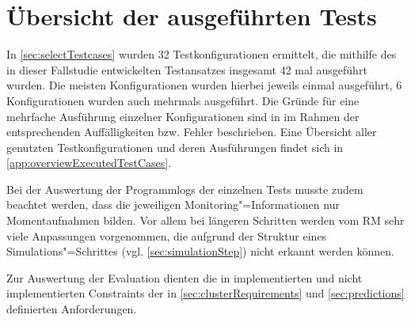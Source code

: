 \section{Übersicht der ausgeführten Tests}
\label{sec:overviewExecTestCases}

In \autoref{sec:selectTestcases} wurden 32 Testkonfigurationen ermittelt, die mithilfe des in dieser Fallstudie entwickelten Testansatzes insgesamt 42 mal ausgeführt wurden.
Die meisten Konfigurationen wurden hierbei jeweils einmal ausgeführt, 6 Konfigurationen wurden auch mehrmals ausgeführt.
Die Gründe für eine mehrfache Ausführung einzelner Konfigurationen sind in im Rahmen der entsprechenden Auffälligkeiten bzw. Fehler beschrieben.
Eine Übersicht aller genutzten Testkonfigurationen und deren Ausführungen findet sich in \autoref{app:overviewExecutedTestCases}.

Bei der Auswertung der Programmlogs der einzelnen Tests musste zudem beachtet werden, dass die jeweiligen Monitoring"=Informationen nur Momentaufnahmen bilden.
Vor allem bei längeren Schritten werden vom \ac{RM} sehr viele Anpassungen vorgenommen, die aufgrund der Struktur eines Simulations"=Schrittes (vgl. \autoref{sec:simulationStep}) nicht erkannt werden können.

Zur Auswertung der Evaluation dienten die in  implementierten und nicht implementierten Constraints der in \autoref{sec:clusterRequirements} und \autoref{sec:predictions} definierten Anforderungen.

